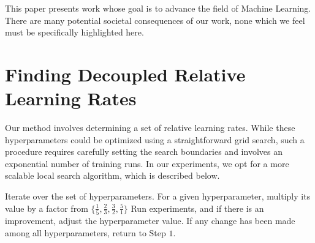 \documentclass{article}
\theoremstyle{plain}
\theoremstyle{definition}
\theoremstyle{remark}
\newcommand{\jmr}[2]{\textcolor{purple}{[JM:] \sout{#1} #2}}
\begin{document}
    This paper presents work whose goal is to advance the field of Machine Learning. There are many potential societal consequences of our work, none which we feel must be specifically highlighted here.
    
    
    
    
    
    \newpage
    \appendix
    \onecolumn
    \section{Finding Decoupled Relative Learning Rates} \label{app:local_search}
    
    
    Our method involves determining a set of relative learning rates. While these hyperparameters could be optimized using a straightforward grid search, such a procedure requires carefully setting the search boundaries and involves an exponential number of training runs. In our experiments, we opt for a more scalable local search algorithm, which is described below. 
    
    
    \begin{algorithm}
    \caption{Local Search}
    \begin{algorithmic}[1]
    \State Iterate over the set of hyperparameters.
    \State For a given hyperparameter, multiply its value by a factor from $\{\frac{1}{5}, \frac{2}{3}, \frac{3}{2}, \frac{5}{1}\}$
    \State Run experiments, and if there is an improvement, adjust the hyperparameter value.
    \State If any change has been made among all hyperparameters, return to Step $1$.
    \end{algorithmic}
    \label{algo_local}
    \end{algorithm}
    
\end{document}
